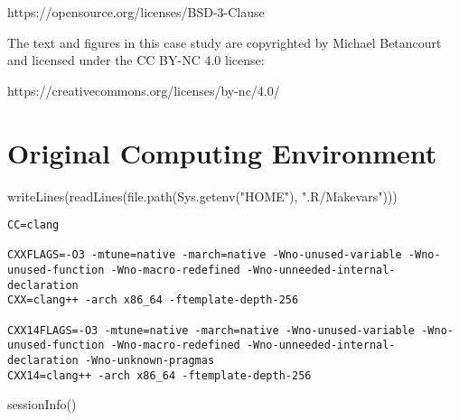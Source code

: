 \documentclass[
  letterpaper,
  DIV=11,
  numbers=noendperiod]{scrartcl}
\newenvironment{Shaded}{\begin{snugshade}}{\end{snugshade}}
\newcommand{\FunctionTok}[1]{\textcolor[rgb]{0.28,0.35,0.67}{#1}}
\newcommand{\NormalTok}[1]{\textcolor[rgb]{0.00,0.23,0.31}{#1}}
\newcommand{\StringTok}[1]{\textcolor[rgb]{0.13,0.47,0.30}{#1}}
\begin{document}
https://opensource.org/licenses/BSD-3-Clause

The text and figures in this case study are copyrighted by Michael
Betancourt and licensed under the CC BY-NC 4.0 license:

https://creativecommons.org/licenses/by-nc/4.0/

\section*{Original Computing
Environment}\label{original-computing-environment}

\begin{Shaded}
\begin{Highlighting}[]
\FunctionTok{writeLines}\NormalTok{(}\FunctionTok{readLines}\NormalTok{(}\FunctionTok{file.path}\NormalTok{(}\FunctionTok{Sys.getenv}\NormalTok{(}\StringTok{"HOME"}\NormalTok{), }\StringTok{".R/Makevars"}\NormalTok{)))}
\end{Highlighting}
\end{Shaded}

\begin{verbatim}
CC=clang

CXXFLAGS=-O3 -mtune=native -march=native -Wno-unused-variable -Wno-unused-function -Wno-macro-redefined -Wno-unneeded-internal-declaration
CXX=clang++ -arch x86_64 -ftemplate-depth-256

CXX14FLAGS=-O3 -mtune=native -march=native -Wno-unused-variable -Wno-unused-function -Wno-macro-redefined -Wno-unneeded-internal-declaration -Wno-unknown-pragmas
CXX14=clang++ -arch x86_64 -ftemplate-depth-256
\end{verbatim}

\begin{Shaded}
\begin{Highlighting}[]
\FunctionTok{sessionInfo}\NormalTok{()}
\end{Highlighting}
\end{Shaded}
\end{document}
